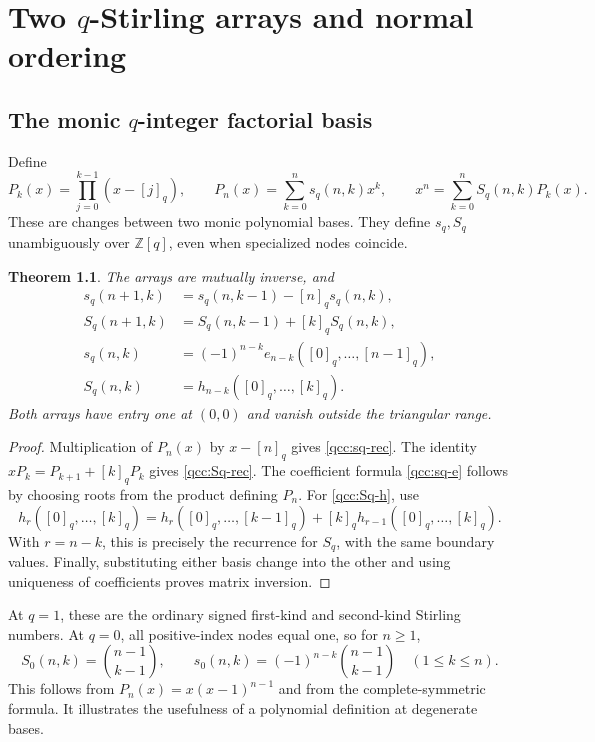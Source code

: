 \documentclass[11pt,a4paper,oneside,openany]{book}
\newtheorem{theorem}{Theorem}[chapter]
\theoremstyle{definition}
\theoremstyle{remark}
\newcommand{\Z}{\mathbb Z}
\newcommand{\qbname}{\texorpdfstring{$q$}{q}}
\begin{document}
\chapter{Two \qbname-Stirling arrays and normal ordering}
\label{qcc:qstirling}
\section{The monic \qbname-integer factorial basis}
Define
\begin{equation}\label{qcc:qstirling-basis}
 P_k(x)=\prod_{j=0}^{k-1}(x-[j]_q),\qquad
 P_n(x)=\sum_{k=0}^n s_q(n,k)x^k,\qquad
 x^n=\sum_{k=0}^n S_q(n,k)P_k(x).
\end{equation}
These are changes between two monic polynomial bases. They define \(s_q,S_q\)
unambiguously over \(\Z[q]\), even when specialized nodes coincide.

\begin{theorem}\label{qcc:qstirling-basic}
The arrays are mutually inverse, and
\begin{align}
 s_q(n+1,k)&=s_q(n,k-1)-[n]_qs_q(n,k),\label{qcc:sq-rec}\\
 S_q(n+1,k)&=S_q(n,k-1)+[k]_qS_q(n,k),\label{qcc:Sq-rec}\\
 s_q(n,k)&=(-1)^{n-k}e_{n-k}([0]_q,\ldots,[n-1]_q),\label{qcc:sq-e}\\
 S_q(n,k)&=h_{n-k}([0]_q,\ldots,[k]_q).\label{qcc:Sq-h}
\end{align}
Both arrays have entry one at \((0,0)\) and vanish outside the triangular range.
\end{theorem}
\begin{proof}
Multiplication of \(P_n(x)\) by \(x-[n]_q\) gives
\eqref{qcc:sq-rec}. The identity \(xP_k=P_{k+1}+[k]_qP_k\) gives
\eqref{qcc:Sq-rec}. The coefficient formula \eqref{qcc:sq-e} follows by
choosing roots from the product defining \(P_n\).
For \eqref{qcc:Sq-h}, use
\[
 h_r([0]_q,\ldots,[k]_q)
 =h_r([0]_q,\ldots,[k-1]_q)+[k]_qh_{r-1}([0]_q,\ldots,[k]_q).
\]
With \(r=n-k\), this is precisely the recurrence for \(S_q\), with the same
boundary values. Finally, substituting either basis change into the other and
using uniqueness of coefficients proves matrix inversion.
\end{proof}
At \(q=1\), these are the ordinary signed first-kind and second-kind Stirling
numbers. At \(q=0\), all positive-index nodes equal one, so for \(n\ge1\),
\[
 S_0(n,k)=\binom{n-1}{k-1},\qquad
 s_0(n,k)=(-1)^{n-k}\binom{n-1}{k-1}\quad(1\le k\le n).
\]
This follows from \(P_n(x)=x(x-1)^{n-1}\) and from the complete-symmetric
formula. It illustrates the usefulness of a polynomial definition at degenerate
bases.
\end{document}
